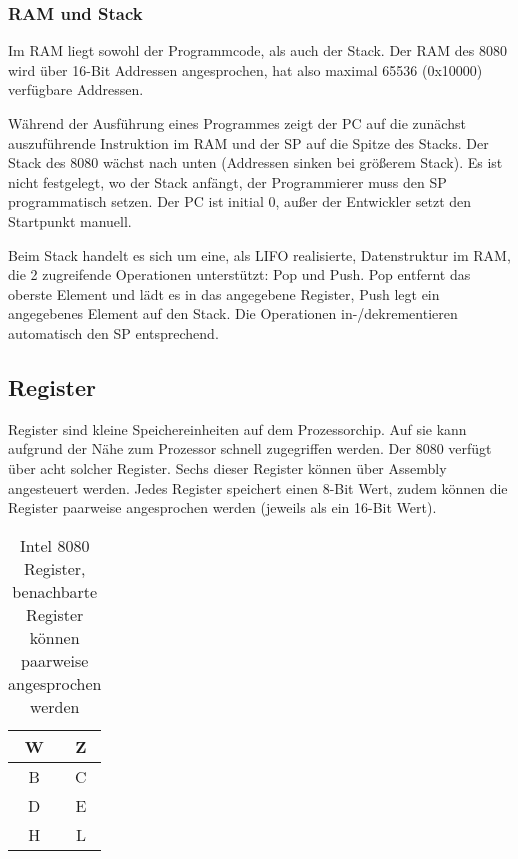 \subsubsection{RAM und Stack}

Im \ac{RAM} liegt sowohl der Programmcode, als auch der Stack.
Der \ac{RAM} des 8080 wird über 16-Bit Addressen angesprochen, hat also maximal 65536 (0x10000) verfügbare Addressen.

Während der Ausführung eines Programmes zeigt der \ac{PC} auf die zunächst auszuführende Instruktion im \ac{RAM} und der \ac{SP} auf die Spitze des Stacks. Der Stack des 8080 wächst nach unten (Addressen sinken bei größerem Stack).
Es ist nicht festgelegt, wo der Stack anfängt, der Programmierer muss den \ac{SP} programmatisch setzen. Der \ac{PC} ist initial 0, außer der Entwickler setzt den Startpunkt manuell.

Beim Stack handelt es sich um eine, als \ac{LIFO} realisierte, Datenstruktur im \ac{RAM}, die 2 zugreifende Operationen unterstützt: Pop und Push. Pop entfernt das oberste Element und lädt es in das angegebene Register, Push legt ein angegebenes Element auf den Stack. Die Operationen in-/dekrementieren automatisch den \ac{SP} entsprechend.

\subsection{Register}

Register sind kleine Speichereinheiten auf dem Prozessorchip. Auf sie kann aufgrund der Nähe zum Prozessor schnell zugegriffen werden. Der 8080 verfügt über acht solcher Register. Sechs dieser Register können über Assembly angesteuert werden. Jedes Register speichert einen 8-Bit Wert, zudem können die Register paarweise angesprochen werden (jeweils als ein 16-Bit Wert).

\begin{table}[h]
    \centering
    \caption{Intel 8080 Register, benachbarte Register können paarweise angesprochen werden}
    \label{tab:regs}
    \begin{tabular}{|c|c|}
        \hline
        W & Z \\\hline
        B & C \\\hline
        D & E \\\hline
        H & L \\\hline
    \end{tabular}
\end{table}

